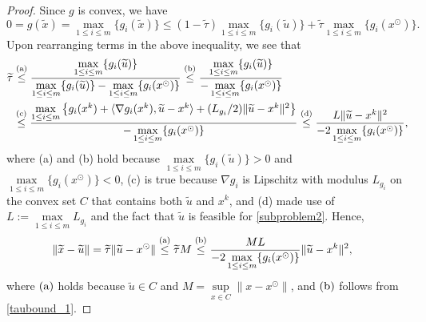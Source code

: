 \documentclass[10pt]{article}
\numberwithin{equation}{section}
\def\xfeas{x^\odot}
\begin{document}
\begin{proof}
Since $g$ is convex, we have
\[
0 = g(\widetilde{x})=\max\limits_{1 \le i \le m} \{g_i(\widetilde{x})\} \leq (1 - \widetilde{\tau})\max\limits_{1 \le i \le m} \{g_i(\widetilde{u})\} + \widetilde{\tau} \max\limits_{1 \le i \le m} \{g_i(\xfeas)\}.
\]
Upon rearranging terms in the above inequality, we see that
\begin{equation}\label{taubound_1}
\begin{aligned}
\widetilde{\tau}&\overset{\rm (a)}\leq\frac{\max\limits_{1 \le i \le m} \{g_i(\widetilde{u})\}}{\max\limits_{1 \le i \le m} \{g_i(\widetilde{u})\} - \max\limits_{1 \le i \le m}\{g_i(\xfeas)\}} \overset{\rm (b)}\leq \frac{\max\limits_{1 \le i \le m}\{g_i(\widetilde{u})\}}{-\max\limits_{1 \le i \le m}\{g_i(\xfeas)\}} \\
& \overset{\rm (c)}\le \frac{\max\limits_{1 \le i \le m}\left\{g_i(x^k) + \langle\nabla g_i(x^k),\widetilde{u}-x^k\rangle + (L_{g_i}/2)\|\widetilde{u} - x^k\|^2\right\}}{-\max\limits_{1 \le i \le m}\{g_i(\xfeas)\}} \overset{\rm (d)}\leq \frac{L\|\widetilde{u} - x^k\|^2}{-2\max\limits_{1 \le i \le m}\{g_i(\xfeas)\}},
\end{aligned}
\end{equation}
where (a) and (b) hold because $\max\limits_{1 \le i \le m}\{g_i(\widetilde{u})\} > 0$ and $\max\limits_{1 \le i \le m}\{g_i(\xfeas)\} < 0$, (c) is true because $\nabla g_i$ is Lipschitz with modulus $L_{g_i}$ on the convex set $C$ that contains both $\widetilde u$ and $x^k$, and (d) made use of $L := \max\limits_{1 \le i \le m} L_{g_i}$ and the fact that $\widetilde u$ is feasible for \eqref{subproblem2}. Hence,
\[
\begin{aligned}
\|\widetilde{x} - \widetilde{u}\|& = \widetilde{\tau}\|\widetilde{u} - \xfeas\|\overset{\rm (a)}\leq \widetilde{\tau}M \overset{\rm (b)}\leq \frac{ML}{-2\max\limits_{1 \le i \le m}\{g_i(\xfeas)\}}\|\widetilde{u} - x^k\|^2,
\end{aligned}
\]
where $\rm (a)$ holds because $\widetilde{u}\in C$ and $M = \sup\limits_{x\in C}\|x - \xfeas\|$, and $\rm(b)$ follows from \eqref{taubound_1}.


\end{proof}
\end{document}
